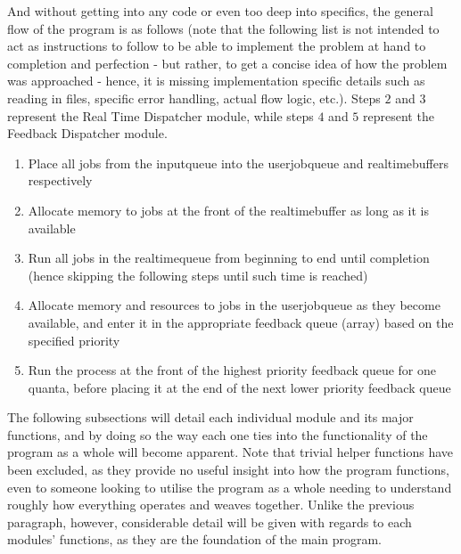 \documentclass[11pt]{article}
\begin{document}
And without getting into any code or even too deep into specifics, the general flow of the program is as follows (note that the following list is not intended to act as instructions to follow to be able to implement the problem at hand to completion and perfection - but rather, to get a concise idea of how the problem was approached - hence, it is missing implementation specific details such as reading in files, specific error handling, actual flow logic, etc.). Steps $2$ and $3$ represent the Real Time Dispatcher module, while steps $4$ and $5$ represent the Feedback Dispatcher module.
\begin{enumerate}
\item Place all jobs from the inputqueue into the userjobqueue and realtimebuffers respectively
\item Allocate memory to jobs at the front of the realtimebuffer as long as it is available
\item Run all jobs in the realtimequeue from beginning to end until completion (hence skipping the following steps until such time is reached)
\item Allocate memory and resources to jobs in the userjobqueue as they become available, and enter it in the appropriate feedback queue (array) based on the specified priority
\item Run the process at the front of the highest priority feedback queue for one quanta, before placing it at the end of the next lower priority feedback queue
\end{enumerate}

The following subsections will detail each individual module and its major functions, and by doing so the way each one ties into the functionality of the program as a whole will become apparent. Note that trivial helper functions have been excluded, as they provide no useful insight into how the program functions, even to someone looking to utilise the program as a whole needing to understand roughly how everything operates and weaves together. Unlike the previous paragraph, however, considerable detail will be given with regards to each modules' functions, as they are the foundation of the main program.
\end{document}
